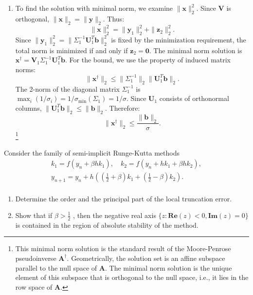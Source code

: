 \begin{solution}
\begin{enumerate}
\item[(b)] To find the solution with minimal norm, we examine $\|\mathbf{x}\|_2^2$. Since $\mathbf{V}$ is orthogonal, $\|\mathbf{x}\|_2 = \|\mathbf{y}\|_2$. Thus:
\[
\|\mathbf{x}\|_2^2 = \|\mathbf{y}_1\|_2^2 + \|\mathbf{z}_2\|_2^2.
\]
Since $\|\mathbf{y}_1\|_2^2 = \|\Sigma_1^{-1} \mathbf{U}_1^T \mathbf{b}\|_2^2$ is fixed by the minimization requirement, the total norm is minimized if and only if $\mathbf{z}_2 = \mathbf{0}$. The minimal norm solution is $\mathbf{x}^\dagger = \mathbf{V}_1 \Sigma_1^{-1} \mathbf{U}_1^T \mathbf{b}$. 
For the bound, we use the property of induced matrix norms:
\[
\|\mathbf{x}^\dagger\|_2 \leq \|\Sigma_1^{-1}\|_2 \|\mathbf{U}_1^T \mathbf{b}\|_2.
\]
The 2-norm of the diagonal matrix $\Sigma_1^{-1}$ is $\max_i (1/\sigma_i) = 1/\sigma_{\min}(\Sigma_1) = 1/\sigma$. Since $\mathbf{U}_1$ consists of orthonormal columns, $\|\mathbf{U}_1^T \mathbf{b}\|_2 \leq \|\mathbf{b}\|_2$. Therefore:
\[
\|\mathbf{x}^\dagger\|_2 \leq \frac{\|\mathbf{b}\|_2}{\sigma}.
\] \footnote{This minimal norm solution is the standard result of the Moore-Penrose pseudoinverse $\mathbf{A}^\dagger$. Geometrically, the solution set is an affine subspace parallel to the null space of $\mathbf{A}$. The minimal norm solution is the unique element of this subspace that is orthogonal to the null space, i.e., it lies in the row space of $\mathbf{A}$.}
\end{enumerate}
\end{solution}

\begin{exercise}
\label{applied:2021:5}
Consider the family of semi-implicit Runge-Kutta methods
\[
\begin{array}{l} k _ {1} = f \left(y _ {n} + \beta h k _ {1}\right), \quad k _ {2} = f \left(y _ {n} + h k _ {1} + \beta h k _ {2}\right), \\ y _ {n + 1} = y _ {n} + h \left(\left(\frac {1}{2} + \beta\right) k _ {1} + \left(\frac {1}{2} - \beta\right) k _ {2}\right). \\ \end{array}
\]

\begin{enumerate}
\item[(a)] Determine the order and the principal part of the local truncation error.   
\item[(b)] Show that if $\beta > \frac { 1 } { 2 }$ , then the negative real axis $\{ z : \mathbf { R e } ( z ) < 0 , \mathbf { I m } ( z ) = 0 \}$ is contained in the region of absolute stability of the method.
\end{enumerate}
\end{exercise}

